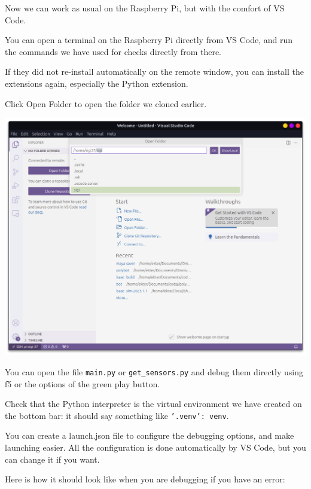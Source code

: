 \documentclass{article}
\begin{document}
Now we can work as usual on the Raspberry Pi, but with the comfort of VS Code.

You can open a terminal on the Raspberry Pi directly from VS Code, and run the commands we have
used for checks directly from there.

If they did not re-install automatically on the remote window, you can install the extensions
again, especially the Python extension.

Click Open Folder to open the folder we cloned earlier.

\includegraphics[scale=0.3]{img/vsc_open_folder.png}

You can open the file \texttt{main.py} or \texttt{get\_sensors.py} and debug them directly using
f5 or the options of the green play button.

Check that the Python interpreter is the virtual environment we have created on the bottom bar:
it should say something like \texttt{'.venv': venv}.

You can create a launch.json file to configure the debugging options, and make launching easier.
All the configuration is done automatically by VS Code, but you can change it if you want.

Here is how it should look like when you are debugging if you have an error:
\end{document}

